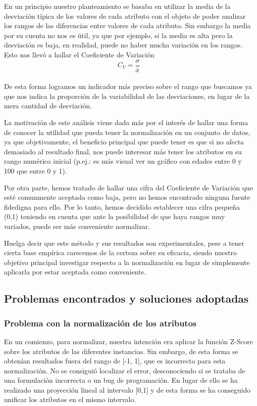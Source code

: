 \documentclass[10pt,a4paper]{article}
\begin{document}
En un principio nuestro planteamiento se basaba en utilizar la media de la desviación típica de los valores de cada atributo con el objeto de poder analizar los rangos 
de las diferencias entre valores de cada atributo. Sin embargo la media por su cuenta no nos es útil, ya que por ejemplo, si la media es alta pero la desviación es baja, 
en realidad, puede no haber mucha variación en los rangos. Esto nos llevó a
hallar el Coeficiente de Variación\\

\begin{equation}
C_{V}=\frac{\sigma}{\bar{x}}
 \end{equation}\\

De esta forma logramos un indicador más preciso sobre el rango que buscamos ya que nos indica la proporción de la variabilidad de las desviaciones, en lugar de la mera 
cantidad de desviación.

La motivación de este análisis viene dada más por el interés de hallar una forma de conocer la utilidad que pueda tener la normalización en un conjunto de datos, ya que
 objetivamente, el beneficio principal que puede tener es que si no afecta demasiado al resultado final, nos puede interesar más tener los atributos en su rango numérico inicial (p.ej.: es más visual ver un gráfico con edades entre 0 y 100 que entre 0 y 1).

Por otra parte, hemos tratado de hallar una cifra del Coeficiente de Variación que esté comunmente aceptada como baja, pero no hemos encontrado ninguna fuente fidedigna 
para ello. Por lo tanto, hemos decidido establecer una cifra pequeña (0,1) teniendo en cuenta que ante la posibilidad de que haya rangos muy variados, puede ser más 
conveniente normalizar.

Huelga decir que este método y sus resultados son experimentales, pese a tener cierta base empírica carecemos de la certeza sobre su eficacia, siendo nuestro objetivo 
principal investigar respecto a la normalización en lugar de simplemente aplicarla por estar aceptada como conveniente. 


\subsection{Problemas encontrados y soluciones adoptadas}


\subsubsection{Problema con la normalización de los atributos}
En un comienzo, para normalizar, nuestra intención era aplicar la función Z-Score sobre los atributos de las diferentes instancias. Sin embargo, de esta forma se 
obtenían resultados fuera del rango de [-1, 1], que es incorrecto para esta normalización. No se consiguió localizar el error, desconociendo si se trataba de una
 formulación incorrecta o un bug de programación. En lugar de ello se ha realizado una proyección lineal al intervalo [0,1] y de esta forma se ha conseguido 
 unificar los atributos en el mismo intervalo.
\end{document}
